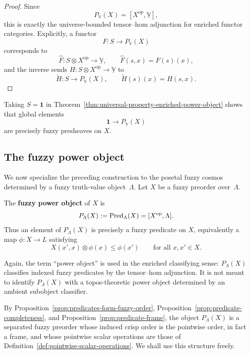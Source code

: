 \begin{proof}
    Since
    \[
        P_{\mathbb V}(X)=[X^{\mathrm{op}},\underline{\mathbb V}],
    \]
    this is exactly the universe-bounded tensor--hom adjunction for enriched functor categories. Explicitly, a functor
    \[
        F:S\to P_{\mathbb V}(X)
    \]
    corresponds to
    \[
        \widehat F:S\otimes X^{\mathrm{op}}\to\underline{\mathbb V},
        \qquad
        \widehat F(s,x)=F(s)(x),
    \]
    and the inverse sends \(H:S\otimes X^{\mathrm{op}}\to\underline{\mathbb V}\) to
    \[
        \widetilde H:S\to P_{\mathbb V}(X),
        \qquad
        \widetilde H(s)(x)=H(s,x).
    \]
\end{proof}

\begin{remark}
\label{rem:global-elements-of-enriched-power-object}
    Taking \(S=\mathbf 1\) in Theorem~\ref{thm:universal-property-enriched-power-object} shows that global elements
    \[
        \mathbf 1\to P_{\mathbb V}(X)
    \]
    are precisely fuzzy presheaves on \(X\).
\end{remark}

\subsection{The fuzzy power object}
\label{subsec:the-fuzzy-power-object}

We now specialize the preceding construction to the posetal fuzzy cosmos determined by a fuzzy truth-value object~\(\Lambda\). Let \(X\) be a fuzzy preorder over~\(\Lambda\).

\begin{definition}
\label{def:fuzzy-power-object}
    The \textbf{fuzzy power object} of \(X\) is
    \[
        P_\Lambda(X):=\mathrm{Pred}_\Lambda(X)=[X^{\mathrm{op}},\Lambda].
    \]
    Thus an element of \(P_\Lambda(X)\) is precisely a fuzzy predicate on \(X\), equivalently a map \(\phi:X\to L\) satisfying
    \[
        X(x',x)\otimes \phi(x)\leq \phi(x')
        \qquad
        \text{for all }x,x'\in X.
    \]
\end{definition}

Again, the term ``power object'' is used in the enriched classifying sense: \(P_\Lambda(X)\) classifies indexed fuzzy predicates by the tensor--hom adjunction. It is not meant to identify \(P_\Lambda(X)\) with a topos-theoretic power object determined by an ambient subobject classifier.

By Proposition~\ref{prop:predicates-form-fuzzy-order}, Proposition~\ref{prop:predicate-completeness}, and Proposition~\ref{prop:predicate-frame}, the object \(P_\Lambda(X)\) is a separated fuzzy preorder whose induced crisp order is the pointwise order, in fact a frame, and whose pointwise scalar operations are those of Definition~\ref{def:pointwise-scalar-operations}. We shall use this structure freely.

